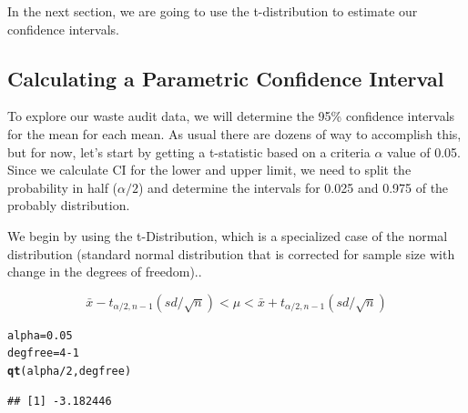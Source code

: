 \documentclass{tufte-handout}\usepackage[]{graphicx}\usepackage[]{color}
\makeatletter
\newcommand{\hlnum}[1]{\textcolor[rgb]{0.686,0.059,0.569}{#1}}%
\newcommand{\hlopt}[1]{\textcolor[rgb]{0,0,0}{#1}}%
\newcommand{\hlstd}[1]{\textcolor[rgb]{0.345,0.345,0.345}{#1}}%
\newcommand{\hlkwb}[1]{\textcolor[rgb]{0.69,0.353,0.396}{#1}}%
\newcommand{\hlkwd}[1]{\textcolor[rgb]{0.737,0.353,0.396}{\textbf{#1}}}%
\newenvironment{kframe}{%
 \def\at@end@of@kframe{}%
 \ifinner\ifhmode%
  \def\at@end@of@kframe{\end{minipage}}%
  \begin{minipage}{\columnwidth}%
 \fi\fi%
 \def\FrameCommand##1{\hskip\@totalleftmargin \hskip-\fboxsep
 \colorbox{shadecolor}{##1}\hskip-\fboxsep
     \hskip-\linewidth \hskip-\@totalleftmargin \hskip\columnwidth}%
 \MakeFramed {\advance\hsize-\width
   \@totalleftmargin\z@ \linewidth\hsize
   \@setminipage}}%
 {\par\unskip\endMakeFramed%
 \at@end@of@kframe}
\newenvironment{knitrout}{}{} %
\makeatother
\begin{document}
In the next section, we are going to use the t-distribution to estimate our confidence intervals.

\subsection{Calculating a Parametric Confidence Interval}

To explore our waste audit data, we will determine the 95\% confidence intervals for the mean for each mean. As usual there are dozens of way to accomplish this, but for now, let's start by getting a t-statistic based on a criteria $\alpha$ value of 0.05. Since we calculate CI for the lower and upper limit, we need to split the probability in half ($\alpha/2$) and determine the intervals for 0.025 and 0.975 of the probably distribution.  

We begin by using the t-Distribution, which is a specialized case of the normal distribution (standard normal distribution that is corrected for sample size with change in the degrees of freedom).. 

\begin{equation}
\bar{x} - t_{\alpha/2, n-1}(sd/\sqrt{n}) < \mu < \bar{x} + t_{\alpha/2, n-1}(sd/\sqrt{n}) 
\end{equation}

\begin{knitrout}
\color{fgcolor}\begin{kframe}
\begin{alltt}
\hlstd{alpha} \hlkwb{=} \hlnum{0.05}
\hlstd{degfree} \hlkwb{=} \hlnum{4} \hlopt{-} \hlnum{1}
\hlkwd{qt}\hlstd{(alpha}\hlopt{/}\hlnum{2}\hlstd{, degfree)}
\end{alltt}
\begin{verbatim}
## [1] -3.182446
\end{verbatim}
\end{kframe}
\end{knitrout}
\end{document}
